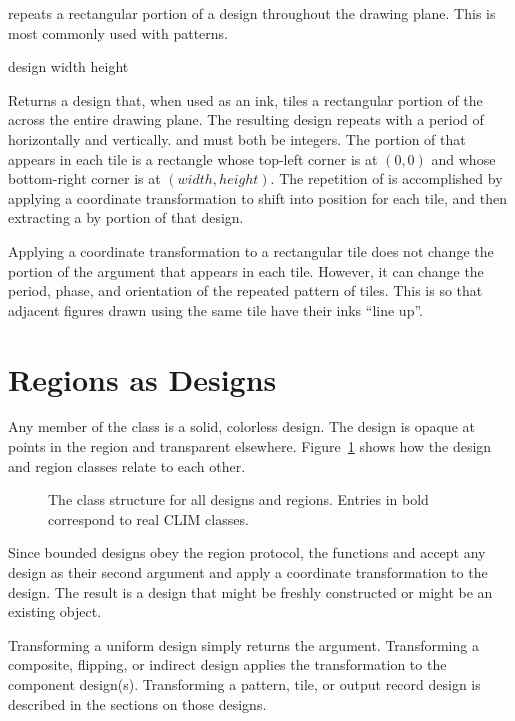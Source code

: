  repeats a rectangular portion of a design throughout the
drawing plane.  This is most commonly used with patterns.

 {design width height}

Returns a design that, when used as an ink, tiles a rectangular portion of the
  across the entire drawing plane.  The resulting
design repeats with a period of  horizontally and 
vertically.   and  must both be integers.  The portion of
 that appears in each tile is a rectangle whose top-left corner is
at $(0,0)$ and whose bottom-right corner is at $(width,height)$.  The repetition
of  is accomplished by applying a coordinate transformation to shift
 into position for each tile, and then extracting a  by
 portion of that design.

Applying a coordinate transformation to a rectangular tile does not change the
portion of the argument  that appears in each tile.  However, it can
change the period, phase, and orientation of the repeated pattern of tiles.
This is so that adjacent figures drawn using the same tile have their inks
``line up''.


\section {Regions as Designs}

Any member of the class  is a solid, colorless design.  The design is
opaque at points in the region and transparent elsewhere.
Figure~\ref{design-classes} shows how the design and region classes relate to
each other.

\begin{figure}
\ifpsfig\centerline{}\else\vspace{4.0in}\fi
\caption{\label{design-classes} The class structure for all designs and regions.
Entries in bold correspond to real CLIM classes.}
\end{figure}

Since bounded designs obey the region protocol, the functions
 and  accept any design as their
second argument and apply a coordinate transformation to the design.  The result
is a design that might be freshly constructed or might be an existing object.

Transforming a uniform design simply returns the argument.  Transforming a
composite, flipping, or indirect design applies the transformation to the
component design(s).  Transforming a pattern, tile, or output record design is
described in the sections on those designs.


